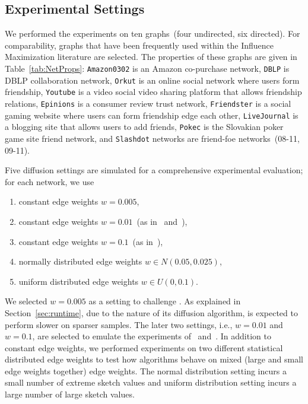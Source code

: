 \documentclass[final,5p,times,twocolumn]{elsarticle}
\newcommand\acro{{\sc{HyperFuseR\xspace}\xspace}\xspace}
\newcommand\fixme[1]{#1}
\begin{document}
\subsection{Experimental Settings} \label{sec:expset}

We performed the experiments on ten graphs~(four undirected, six directed). For comparability, graphs that have been frequently used within the Influence Maximization literature are selected. The properties of these graphs are given in Table~\ref{tab:NetProps}:  {\tt Amazon0302} is an Amazon co-purchase network, {\tt DBLP} is DBLP collaboration network, {\tt Orkut} is an online social network where users form friendship,  {\tt Youtube} is a video social video sharing platform that allows friendship relations, {\tt Epinions} is a consumer review trust network, {\tt Friendster} is a social gaming website where users can form friendship edge each other, {\tt LiveJournal} is a blogging site that allows users to add friends, {\tt Pokec} is the Slovakian poker game site friend network, and {\tt Slashdot} networks are friend-foe networks~(08-11, 09-11).

Five diffusion settings are simulated for a comprehensive experimental evaluation; for each network, we use 
\fixme{
\begin{enumerate}
  \setlength{\itemsep}{0.2pt}
  \setlength{\parskip}{0pt}
  \setlength{\parsep}{0pt}
    \item constant edge weights $w = 0.005$,
    \item constant edge weights $w = 0.01$~(as in~\cite{kempe2003maximizing} and~\cite{MixGreedy}),
    \item constant edge weights $w = 0.1$~(as in~\cite{kempe2003maximizing}),
    \item normally distributed edge weights $w \in N(0.05,0.025)$,
    \item uniform distributed edge weights $w \in U(0,0.1)$.
\end{enumerate}
}
\noindent We selected $w=0.005$ as a setting to challenge \acro. As explained in Section~\ref{sec:runtime}, due to the nature of its diffusion algorithm, \acro is expected to perform slower on sparser samples. The later two settings, i.e., $w = 0.01$  and $w = 0.1$, are selected to emulate the experiments of~\cite{kempe2003maximizing} and~\cite{MixGreedy}. In addition to constant edge weights, we performed experiments on two different statistical distributed edge weights to test how algorithms behave on mixed (large and small edge weights together) edge weights. The normal distribution setting incurs a small number of extreme sketch values and uniform distribution setting incurs a large number of large sketch values.
\end{document}
